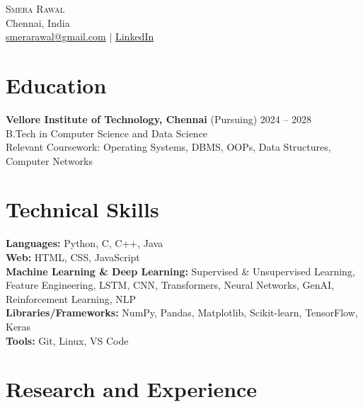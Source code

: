 \documentclass[a4paper,10pt]{article}
\begin{document}
\begin{center}
    {\LARGE \scshape Smera Rawal} \\
    Chennai, India \\
    \href{mailto:smerarawal@gmail.com}{smerarawal@gmail.com} $|$ 
    \href{https://www.linkedin.com/in/smera-rawal}{LinkedIn}
\end{center}

\section{Education}

\textbf{Vellore Institute of Technology, Chennai}  (Pursuing) \hfill 2024 -- 2028 \\
B.Tech in Computer Science and Data Science \\
Relevant Coursework: Operating Systems, DBMS, OOPs, Data Structures, Computer Networks

\section{Technical Skills}

\textbf{Languages:} Python, C, C++, Java \\
\textbf{Web:} HTML, CSS, JavaScript \\
\textbf{Machine Learning \& Deep Learning:} Supervised \& Unsupervised Learning, Feature Engineering, LSTM, CNN, Transformers, Neural Networks, GenAI, Reinforcement Learning, NLP \\
\textbf{Libraries/Frameworks:} NumPy, Pandas, Matplotlib, Scikit-learn, TensorFlow, Keras \\
\textbf{Tools:} Git, Linux, VS Code

\section{Research and Experience}
\end{document}
